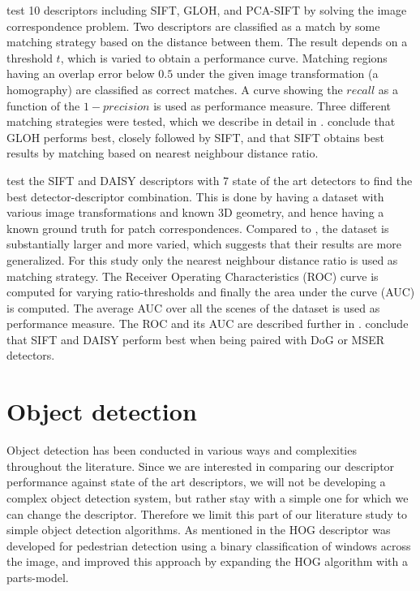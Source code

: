 \documentclass[thesis.tex]{subfiles}
\begin{document}
\citet{mikolajczyk2005performance} test 10 descriptors including SIFT, GLOH, and PCA-SIFT by solving the image correspondence problem. Two descriptors are classified as a match by some matching strategy based on the distance between them. The result depends on a threshold $t$, which is varied to obtain a performance curve. Matching regions having an overlap error below $0.5$ under the given image transformation (a homography) are classified as correct matches. A curve showing the $recall$ as a function of the $1-precision$ is used as performance measure. Three different matching strategies were tested, which we describe in detail in . \citet{mikolajczyk2005performance} conclude that GLOH performs best, closely followed by SIFT, and that SIFT obtains best results by matching based on nearest neighbour distance ratio.

\citet{dahl2011finding} test the SIFT and DAISY descriptors with 7 state of the art detectors to find the best detector-descriptor combination. This is done by having a dataset with various image transformations and known 3D geometry, and hence having a known ground truth for patch correspondences. Compared to \citet{mikolajczyk2005performance}, the dataset is substantially larger and more varied, which suggests that their results are more generalized. For this study only the nearest neighbour distance ratio is used as matching strategy. The Receiver Operating Characteristics (ROC) curve is computed for varying ratio-thresholds and finally the area under the curve (AUC) is computed. The average AUC over all the scenes of the dataset is used as performance measure. The ROC and its AUC are described further in . \citet{dahl2011finding} conclude that SIFT and DAISY perform best when being paired with DoG or MSER detectors.
%
\section{Object detection}
%
Object detection has been conducted in various ways and complexities throughout the literature. Since we are interested in comparing our descriptor performance against state of the art descriptors, we will not be developing a complex object detection system, but rather stay with a simple one for which we can change the descriptor. Therefore we limit this part of our literature study to simple object detection algorithms. As mentioned in  the HOG descriptor was developed for pedestrian detection using a binary classification of windows across the image, and \cite{felzenszwalb2008discriminatively} improved this approach by expanding the HOG algorithm with a parts-model.
\end{document}
